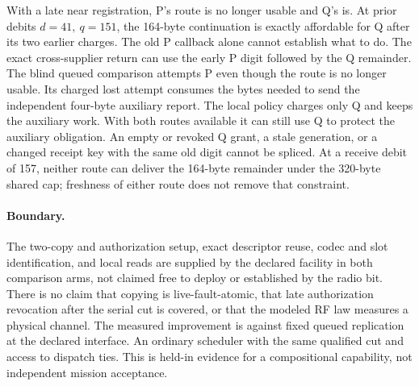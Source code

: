 \documentclass{article}
\begin{document}
With a late near registration, P's route is no longer usable and Q's
is. At prior debits $d=41,\ q=151$, the 164-byte continuation is
exactly affordable for Q after its two earlier charges. The old
P callback alone cannot establish what to do. The exact cross-supplier
return can use the early P digit followed by the Q remainder.
The blind queued comparison attempts P even though the route is no
longer usable. Its charged lost attempt consumes the bytes needed to
send the independent four-byte auxiliary report. The local policy
charges only Q and keeps the auxiliary work. With both routes
available it can still use Q to protect the auxiliary obligation.
An empty or revoked Q grant, a stale generation, or a changed receipt
key with the same old digit cannot be spliced. At a receive debit of
157, neither route can deliver the 164-byte remainder under the
320-byte shared cap; freshness of either route does not remove that
constraint.

\paragraph{Boundary.}
The two-copy and authorization setup, exact descriptor reuse, codec and
slot identification, and local reads are supplied by the declared
facility in both comparison arms, not claimed free to deploy or
established by the radio bit. There is no claim that copying is
live-fault-atomic, that late authorization revocation after the serial
cut is covered, or that the modeled RF law measures a physical
channel. The measured improvement is against fixed queued replication
at the declared interface. An ordinary scheduler with the same
qualified cut and access to dispatch ties. This is held-in evidence for
a compositional capability, not independent mission acceptance.
\end{document}
